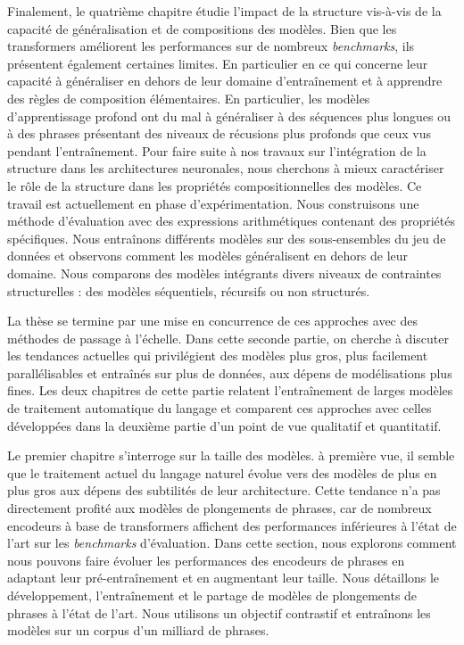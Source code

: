 Finalement, le quatrième chapitre étudie l’impact de la structure vis-à-vis de la capacité de généralisation et de compositions des modèles. Bien que les transformers améliorent les performances sur de nombreux \textit{benchmarks}, ils présentent également certaines limites. En particulier en ce qui concerne leur capacité à généraliser en dehors de leur domaine d'entraînement et à apprendre des règles de composition élémentaires. En particulier, les modèles d'apprentissage profond ont du mal à généraliser à des séquences plus longues ou à des phrases présentant des niveaux de récusions plus profonds que ceux vus pendant l'entraînement. Pour faire suite à nos travaux sur l'intégration de la structure dans les architectures neuronales, nous cherchons à mieux caractériser le rôle de la structure dans les propriétés compositionnelles des modèles. Ce travail est actuellement en phase d'expérimentation. Nous construisons une méthode d'évaluation avec des expressions arithmétiques contenant des propriétés spécifiques. Nous entraînons différents modèles sur des sous-ensembles du jeu de données et observons comment les modèles généralisent en dehors de leur domaine. Nous comparons des modèles intégrants divers niveaux de contraintes structurelles : des modèles séquentiels, récursifs ou non structurés.

La thèse se termine par une mise en concurrence de ces approches avec des méthodes de passage à l’échelle. Dans cette seconde partie, on cherche à discuter les tendances actuelles qui privilégient des modèles plus gros, plus facilement parallélisables et entraînés sur plus de données, aux dépens de modélisations plus fines. Les deux chapitres de cette partie relatent l'entraînement de larges modèles de traitement automatique du langage et comparent ces approches avec celles développées dans la deuxième partie d’un point de vue qualitatif et quantitatif. 

Le premier chapitre s’interroge sur la taille des modèles. à première vue, il semble que le traitement actuel du langage naturel évolue vers des modèles de plus en plus gros aux dépens des subtilités de leur architecture. Cette tendance n’a pas directement profité aux modèles de plongements de phrases, car de nombreux encodeurs à base de transformers affichent des performances inférieures à l'état de l'art sur les \textit{benchmarks} d’évaluation. Dans cette section, nous explorons comment nous pouvons faire évoluer les performances des encodeurs de phrases en adaptant leur pré-entraînement et en augmentant leur taille. Nous détaillons le développement, l'entraînement et le partage de modèles de plongements de phrases à l’état de l’art. Nous utilisons un objectif contrastif et entraînons les modèles sur un corpus d'un milliard de phrases. 

